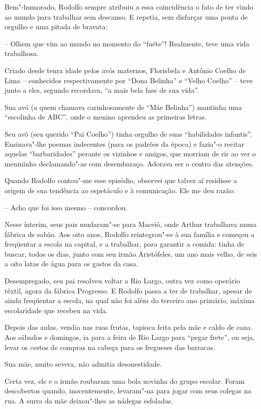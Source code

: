  Bem"-humorado, Rodolfo sempre atribuiu a essa coincidência o fato de
ter vindo ao mundo para trabalhar sem descanso. E repetia, sem
disfarçar uma ponta de orgulho e uma pitada de bravata: 

 -- Olhem que vim ao mundo no momento do
``fuéte''! Realmente, teve uma vida
trabalhosa. 

 Criado desde tenra idade pelos avós maternos, Florisbela e Antônio
Coelho de Lima -- conhecidos respectivamente por ``Dona
Belinha'' e ``Velho Coelho''
-- teve junto a eles, segundo recordava, ``a mais bela
fase de sua vida''. 

 Sua avó (a quem chamava carinhosamente de ``Mãe
Belinha'') mantinha uma ``escolinha de
ABC'', onde o menino aprendeu as primeiras letras. 

 Seu avô (seu querido ``Pai Coelho'') tinha
orgulho de suas ``habilidades infantis''.
Ensinava"-lhe poemas indecentes (para os padrões da época) e fazia"-o
recitar aquelas ``barbaridades'' perante os
vizinhos e amigos, que morriam de rir ao ver o menininho
declamando"-as com desembaraço. Adorava ser o centro das atenções. 

 Quando Rodolfo contou"-me esse episódio, observei que talvez aí
residisse a origem de sua tendência ao espetáculo e à comunicação. Ele
me deu razão: 

 -- Acho que foi isso mesmo -- concordou. 

 Nesse ínterim, seus pais mudaram"-se para Maceió, onde Arthur
trabalhava numa fábrica de sabão. Aos oito anos, Rodolfo
reintegrou"-se à sua família e começou a freqüentar a escola na
capital, e a trabalhar, para garantir a comida: tinha de buscar, todos
os dias, junto com seu irmão Aristófeles, um ano mais velho, de seis a
oito latas de água para os gastos da casa. 

 Desempregado, seu pai resolveu voltar a Rio Largo, outra vez como
operário têxtil, agora da fábrica Progresso. E Rodolfo passa a ter de
trabalhar, apesar de ainda freqüentar a escola, na qual não foi além do
terceiro ano primário, máxima escolaridade que recebeu na vida. 

 Depois das aulas, vendia nas ruas frutas, tapioca feita pela mãe e
caldo de cana. Aos sábados e domingos, ia para a feira de Rio Largo
para ``pegar frete'', ou seja, levar os
cestos de compras na cabeça para os fregueses das barracas. 

 Sua mãe, muito severa, não admitia desonestidade. 

 Certa vez, ele e o irmão roubaram uma bola novinha do grupo escolar.
Foram descobertos quando, inocentemente, levaram"-na para jogar com
seus colegas na rua. A surra da mãe deixou"-lhes as nádegas esfoladas.


